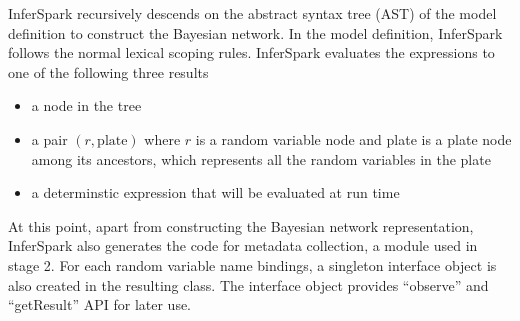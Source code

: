 InferSpark recursively descends on the abstract syntax tree (AST) of the model definition to construct
the Bayesian network.   In the
model definition, InferSpark follows the normal lexical scoping rules.
InferSpark evaluates the expressions to one of the following three results
\begin{itemize}
	\item a node in the tree
	\item a pair $(r, \textrm{plate})$ where $r$ is a random variable node
		and plate is a plate node among its ancestors, which represents all
		the random variables in the plate
	\item a determinstic expression that will be evaluated at run time
\end{itemize}

At this point, apart from constructing the Bayesian network representation, 
InferSpark also generates the code for metadata collection, a module used in 
stage 2. For each random variable name bindings, a singleton interface object 
is also created in the resulting class. 
The interface object provides ``{\sf observe}'' and ``{\sf getResult}'' API for later use.

